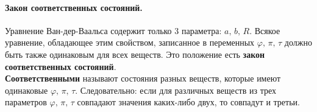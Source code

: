 \paragraph{Закон соответственных состояний.}Уравнение Ван-дер-Ваальса содержит только 3 параметра: $a,\,b,\,R$. Всякое уравнение, обладающее этим свойством, записанное в переменных $\varphi,\,\pi,\,\tau$ должно быть также одинаковым для всех веществ. Это положение есть \textbf{закон соответственных состояний}.\\
\textbf{Соответственными} называют состояния разных веществ, которые имеют одинаковые $\varphi,\,\pi,\,\tau$. Следовательно: если для различных веществ из трех параметров $\varphi,\,\pi,\,\tau$ совпадают значения каких-либо двух, то совпадут и третьи.